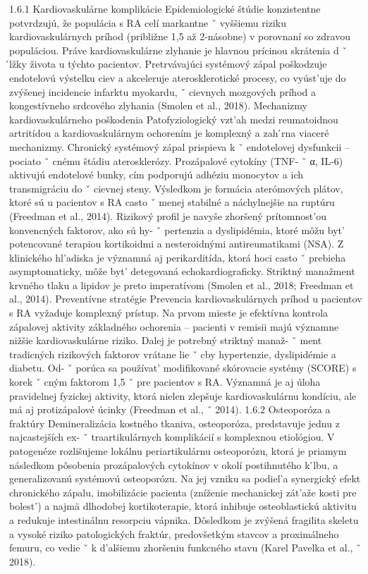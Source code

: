 { 1.6.1 Kardiovaskulárne komplikácie Epidemiologické štúdie konzistentne potvrdzujú, že populácia s RA celí markantne ˇ vyššiemu riziku kardiovaskulárnych príhod (približne 1,5 až 2-násobne) v porovnaní so zdravou populáciou. Práve kardiovaskulárne zlyhanie je hlavnou prícinou skrátenia d ˇ  ́lžky života u týchto pacientov. Pretrvávajúci systémový zápal poškodzuje endotelovú výstelku ciev a akceleruje aterosklerotické procesy, co vyúst’uje do zvýšenej incidencie infarktu myokardu, ˇ cievnych mozgových príhod a kongestívneho srdcového zlyhania (Smolen et al., 2018).
 Mechanizmy kardiovaskulárneho poškodenia Patofyziologický vzt’ah medzi reumatoidnou artritídou a kardiovaskulárnym ochorením je komplexný a zah ́rna viaceré mechanizmy. Chronický systémový zápal prispieva k ˇ endotelovej dysfunkcii – pociato ˇ cnému štádiu aterosklerózy. Prozápalové cytokíny (TNF- ˇ α, IL-6) aktivujú endotelové bunky, cím podporujú adhéziu monocytov a ich transmigráciu do ˇ cievnej steny. Výsledkom je formácia aterómových plátov, ktoré sú u pacientov s RA casto ˇ menej stabilné a náchylnejšie na ruptúru (Freedman et al., 2014).
 Rizikový profil je navyše zhoršený prítomnost’ou konvencných faktorov, ako sú hy- ˇ pertenzia a dyslipidémia, ktoré môžu byt’ potencované terapiou kortikoidmi a nesteroidnými antireumatikami (NSA). Z klinického hl’adiska je významná aj perikarditída, ktorá hoci casto ˇ prebieha asymptomaticky, môže byt’ detegovaná echokardiograficky. Striktný manažment krvného tlaku a lipidov je preto imperatívom (Smolen et al., 2018; Freedman et al., 2014).
 Preventívne stratégie Prevencia kardiovaskulárnych príhod u pacientov s RA vyžaduje komplexný prístup.
 Na prvom mieste je efektívna kontrola zápalovej aktivity základného ochorenia – pacienti v remisii majú významne nižšie kardiovaskulárne riziko. Dalej je potrebný striktný manaž- ˇ ment tradicných rizikových faktorov vrátane lie ˇ cby hypertenzie, dyslipidémie a diabetu. Od- ˇ porúca sa používat’ modifikované skórovacie systémy (SCORE) s korek ˇ cným faktorom 1,5 ˇ pre pacientov s RA. Významná je aj úloha pravidelnej fyzickej aktivity, ktorá nielen zlepšuje kardiovaskulárnu kondíciu, ale má aj protizápalové úcinky (Freedman et al., ˇ 2014).
 1.6.2 Osteoporóza a fraktúry Demineralizácia kostného tkaniva, osteoporóza, predstavuje jednu z najcastejších ex- ˇ traartikulárnych komplikácií s komplexnou etiológiou. V patogenéze rozlišujeme lokálnu periartikulárnu osteoporózu, ktorá je priamym následkom pôsobenia prozápalových cytokínov v okolí postihnutého k ́lbu, a generalizovanú systémovú osteoporózu. Na jej vzniku sa podiel’a synergický efekt chronického zápalu, imobilizácie pacienta (zníženie mechanickej zát’aže kosti pre bolest’) a najmä dlhodobej kortikoterapie, ktorá inhibuje osteoblastickú aktivitu a redukuje intestinálnu resorpciu vápnika. Dôsledkom je zvýšená fragilita skeletu a vysoké riziko patologických fraktúr, predovšetkým stavcov a proximálneho femuru, co vedie ˇ k d’alšiemu zhoršeniu funkcného stavu (Karel Pavelka et al., ˇ 2018).
}
